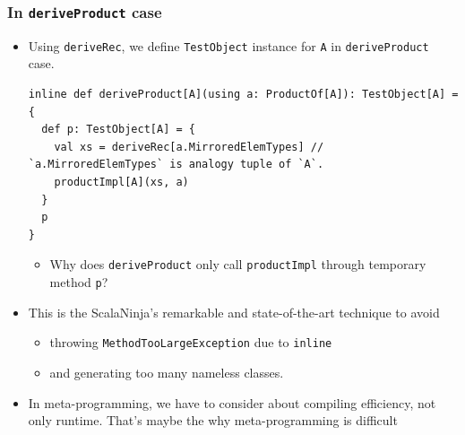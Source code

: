 \begin{frame}[fragile]
  \frametitle{ In \lstinline|deriveProduct| case}
  
  \begin{itemize}
    \item Using \lstinline|deriveRec|, we define \lstinline|TestObject| instance for \lstinline|A|
    in \lstinline|deriveProduct| case.
\begin{lstlisting}[style=scala]
inline def deriveProduct[A](using a: ProductOf[A]): TestObject[A] = {
  def p: TestObject[A] = {
    val xs = deriveRec[a.MirroredElemTypes] // `a.MirroredElemTypes` is analogy tuple of `A`.
    productImpl[A](xs, a)
  }
  p
}
\end{lstlisting}
    \begin{itemize}
      \item Why does \lstinline|deriveProduct| only call \lstinline|productImpl|
      through temporary method \lstinline|p|?
    \end{itemize}

    \item This is the ScalaNinja's remarkable and state-of-the-art technique to
    avoid
    \begin{itemize}
      \item throwing \lstinline|MethodTooLargeException| due to \lstinline|inline|
      \item and generating too many nameless classes.
    \end{itemize}

    \item In meta-programming, we have to consider about compiling efficiency, not only runtime.
    That's maybe the why meta-programming is difficult
  \end{itemize}

\end{frame}

